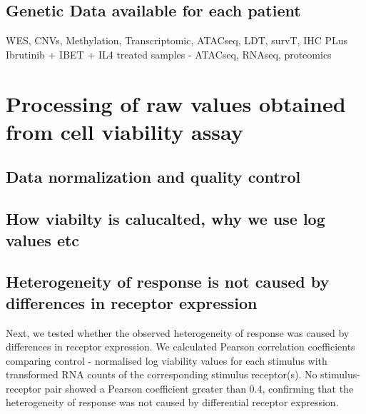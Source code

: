 \documentclass[11pt, a4paper, twosided]{book}
\begin{document}
\hypertarget{genetic-data-available-for-each-patient}{%
\subsection{Genetic Data available for each patient}\label{genetic-data-available-for-each-patient}}

WES, CNVs, Methylation, Transcriptomic, ATACseq, LDT, survT, IHC
PLus Ibrutinib + IBET + IL4 treated samples - ATACseq, RNAseq, proteomics

\hypertarget{processing-of-raw-values-obtained-from-cell-viability-assay}{%
\section{Processing of raw values obtained from cell viability assay}\label{processing-of-raw-values-obtained-from-cell-viability-assay}}

\hypertarget{data-normalization-and-quality-control}{%
\subsection{Data normalization and quality control}\label{data-normalization-and-quality-control}}

\hypertarget{how-viabilty-is-calucalted-why-we-use-log-values-etc}{%
\subsection{How viabilty is calucalted, why we use log values etc}\label{how-viabilty-is-calucalted-why-we-use-log-values-etc}}

\hypertarget{heterogeneity-of-response-is-not-caused-by-differences-in-receptor-expression}{%
\subsection{Heterogeneity of response is not caused by differences in receptor expression}\label{heterogeneity-of-response-is-not-caused-by-differences-in-receptor-expression}}

Next, we tested whether the observed heterogeneity of response was caused by differences in receptor expression. We calculated Pearson correlation coefficients comparing control - normalised log viability values for each stimulus with transformed RNA counts of the corresponding stimulus receptor(s). No stimulus-receptor pair showed a Pearson coefficient greater than 0.4, confirming that the heterogeneity of response was not caused by differential receptor expression.
\end{document}
